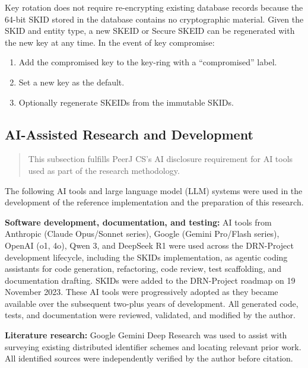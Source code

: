 \documentclass[fleqn,10pt,lineno]{wlpeerj}
\providecommand{\tightlist}{%
  \setlength{\itemsep}{0pt}\setlength{\parskip}{0pt}}
\begin{document}
Key rotation does not require re-encrypting existing database records
because the 64-bit SKID stored in the database contains no cryptographic
material. Given the SKID and entity type, a new SKEID or Secure SKEID
can be regenerated with the new key at any time. In the event of key
compromise:

\begin{enumerate}
\def\labelenumi{\arabic{enumi}.}
\tightlist
\item
  Add the compromised key to the key-ring with a ``compromised'' label.
\item
  Set a new key as the default.
\item
  Optionally regenerate SKEIDs from the immutable SKIDs.
\end{enumerate}

\subsection{AI-Assisted Research and
Development}\label{ai-assisted-research-and-development}

\begin{quote}
This subsection fulfills PeerJ CS's AI disclosure requirement for AI
tools used as part of the research methodology.
\end{quote}

The following AI tools and large language model (LLM) systems were used
in the development of the reference implementation and the preparation
of this research.

\textbf{Software development, documentation, and testing:} AI tools from
Anthropic (Claude Opus/Sonnet series), Google (Gemini Pro/Flash series),
OpenAI (o1, 4o), Qwen 3, and DeepSeek R1 were used across the
DRN-Project development lifecycle, including the SKIDs implementation,
as agentic coding assistants for code generation, refactoring, code
review, test scaffolding, and documentation drafting. SKIDs were added
to the DRN-Project roadmap on 19 November 2023. These AI tools were
progressively adopted as they became available over the subsequent
two-plus years of development. All generated code, tests, and
documentation were reviewed, validated, and modified by the author.

\textbf{Literature research:} Google Gemini Deep Research was used to
assist with surveying existing distributed identifier schemes and
locating relevant prior work. All identified sources were independently
verified by the author before citation.
\end{document}
